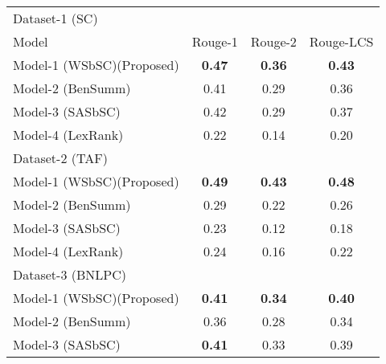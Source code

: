 \begin{table}[]
    \centering
    \begin{tabular}{lccc} \hline
         Dataset-1 (SC)                                                 &               &               &               \\
         Model                                                          & Rouge-1       & Rouge-2       & Rouge-LCS     \\\hline
         Model-1 (WSbSC)(Proposed)                                      & \textbf{0.47} & \textbf{0.36} & \textbf{0.43} \\
         Model-2 (BenSumm)~\cite{chowdhury-etal-2021-tfidf-clustering}  & 0.41          & 0.29          & 0.36          \\
         Model-3 (SASbSC)~\cite{roychowdhury-etal-2022-spectral-base}   & 0.42          & 0.29          & 0.37          \\
         Model-4 (LexRank)~\cite{Erkan-lexRank-2004}                    & 0.22          & 0.14          & 0.20          \\\hline
         Dataset-2 (TAF)                                                &               &               &               \\\hline
         Model-1 (WSbSC)(Proposed)                                      & \textbf{0.49} & \textbf{0.43} & \textbf{0.48} \\
         Model-2 (BenSumm)~\cite{chowdhury-etal-2021-tfidf-clustering}  & 0.29          & 0.22          & 0.26          \\
         Model-3 (SASbSC)~\cite{roychowdhury-etal-2022-spectral-base}   & 0.23          & 0.12          & 0.18          \\
         Model-4 (LexRank)~\cite{Erkan-lexRank-2004}                    & 0.24          & 0.16          & 0.22          \\\hline
         Dataset-3 (BNLPC)                                              &               &               &               \\\hline
         Model-1 (WSbSC)(Proposed)                                      & \textbf{0.41} & \textbf{0.34} & \textbf{0.40} \\
         Model-2 (BenSumm)~\cite{chowdhury-etal-2021-tfidf-clustering}  & 0.36          & 0.28          & 0.34          \\
         Model-3 (SASbSC)~\cite{roychowdhury-etal-2022-spectral-base}   & \textbf{0.41} & 0.33          & 0.39          \\

\end{tabular}
\end{table}
